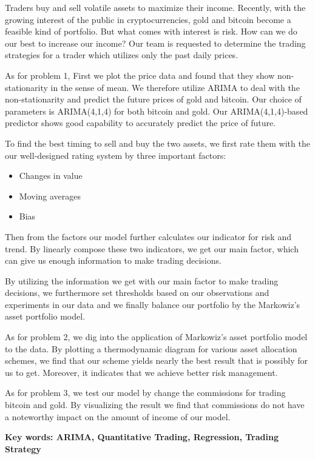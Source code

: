 \documentclass[12pt,a4paper]{article}
\newcommand{\Predictor}{ARIMA }
\begin{document}
\begin{spacing}{1.2}   %



Traders buy and sell volatile assets to maximize their income. Recently, with the growing interest of the public in cryptocurrencies, gold and bitcoin become a feasible kind of portfolio. But what comes with interest is risk. How can we do our best to increase our income? Our team is requested to determine the trading strategies for a trader which utilizes only the past daily prices. 

As for problem 1, First we plot the price data and found that they show non-stationarity in the sense of mean. We therefore utilize \Predictor to deal with the non-stationarity and predict the future prices of gold and bitcoin. Our choice of parameters is ARIMA(4,1,4) for both bitcoin and gold. Our ARIMA(4,1,4)-based predictor shows good capability to accurately predict the price of future.

To find the best timing to sell and buy the two assets, we first rate them with the our well-designed rating system by three important factors:

\begin{itemize}
	\item Changes in value
	\item Moving averages
	\item Bias
\end{itemize}
 

Then from the factors our model further calculates our indicator for risk and trend. By linearly compose these two indicators, we get our main factor, which can give us enough information to make trading decisions.

By utilizing the information we get with our main factor to make trading decisions, we furthermore set thresholds based on our observations and experiments in our data and we finally balance our portfolio by the Markowiz's asset portfolio model.

As for problem 2, we dig into the application of Markowiz's asset portfolio model to the data. By plotting a thermodynamic diagram for various asset allocation schemes, we find that our scheme yields nearly the best result that is possibly for us to get. Moreover, it indicates that we achieve better risk management.

As for problem 3, we test our model by change the commissions for trading bitcoin and gold. By visualizing the result we find that commissions do not have a noteworthy impact on the amount of income of our model.


\textbf{Key words: ARIMA, Quantitative Trading, Regression, Trading Strategy} 

\end{spacing}
\end{document}
